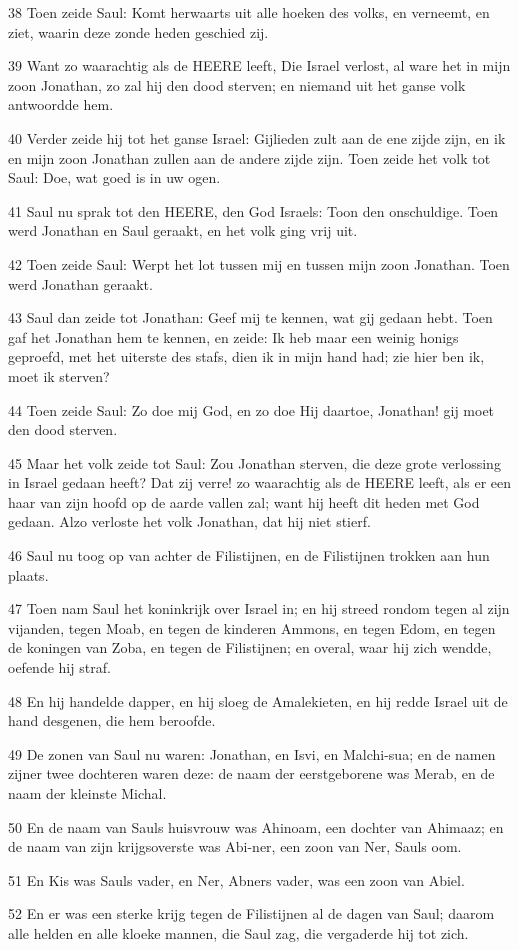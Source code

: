 \par 38 Toen zeide Saul: Komt herwaarts uit alle hoeken des volks, en verneemt, en ziet, waarin deze zonde heden geschied zij.
\par 39 Want zo waarachtig als de HEERE leeft, Die Israel verlost, al ware het in mijn zoon Jonathan, zo zal hij den dood sterven; en niemand uit het ganse volk antwoordde hem.
\par 40 Verder zeide hij tot het ganse Israel: Gijlieden zult aan de ene zijde zijn, en ik en mijn zoon Jonathan zullen aan de andere zijde zijn. Toen zeide het volk tot Saul: Doe, wat goed is in uw ogen.
\par 41 Saul nu sprak tot den HEERE, den God Israels: Toon den onschuldige. Toen werd Jonathan en Saul geraakt, en het volk ging vrij uit.
\par 42 Toen zeide Saul: Werpt het lot tussen mij en tussen mijn zoon Jonathan. Toen werd Jonathan geraakt.
\par 43 Saul dan zeide tot Jonathan: Geef mij te kennen, wat gij gedaan hebt. Toen gaf het Jonathan hem te kennen, en zeide: Ik heb maar een weinig honigs geproefd, met het uiterste des stafs, dien ik in mijn hand had; zie hier ben ik, moet ik sterven?
\par 44 Toen zeide Saul: Zo doe mij God, en zo doe Hij daartoe, Jonathan! gij moet den dood sterven.
\par 45 Maar het volk zeide tot Saul: Zou Jonathan sterven, die deze grote verlossing in Israel gedaan heeft? Dat zij verre! zo waarachtig als de HEERE leeft, als er een haar van zijn hoofd op de aarde vallen zal; want hij heeft dit heden met God gedaan. Alzo verloste het volk Jonathan, dat hij niet stierf.
\par 46 Saul nu toog op van achter de Filistijnen, en de Filistijnen trokken aan hun plaats.
\par 47 Toen nam Saul het koninkrijk over Israel in; en hij streed rondom tegen al zijn vijanden, tegen Moab, en tegen de kinderen Ammons, en tegen Edom, en tegen de koningen van Zoba, en tegen de Filistijnen; en overal, waar hij zich wendde, oefende hij straf.
\par 48 En hij handelde dapper, en hij sloeg de Amalekieten, en hij redde Israel uit de hand desgenen, die hem beroofde.
\par 49 De zonen van Saul nu waren: Jonathan, en Isvi, en Malchi-sua; en de namen zijner twee dochteren waren deze: de naam der eerstgeborene was Merab, en de naam der kleinste Michal.
\par 50 En de naam van Sauls huisvrouw was Ahinoam, een dochter van Ahimaaz; en de naam van zijn krijgsoverste was Abi-ner, een zoon van Ner, Sauls oom.
\par 51 En Kis was Sauls vader, en Ner, Abners vader, was een zoon van Abiel.
\par 52 En er was een sterke krijg tegen de Filistijnen al de dagen van Saul; daarom alle helden en alle kloeke mannen, die Saul zag, die vergaderde hij tot zich.

